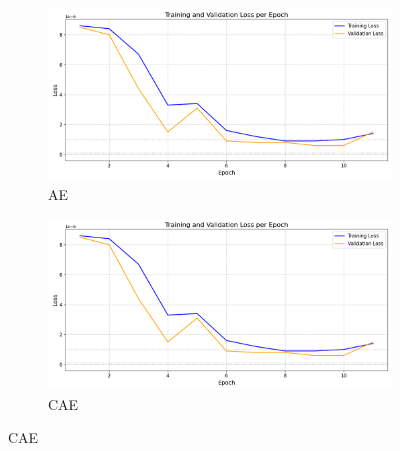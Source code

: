 \begin{figure}[!h]
  \centering
  \begin{subfigure}[t]{.6\textwidth}
    \centering
    \includegraphics[width=\linewidth]{figures/losses/ae.png}
    \caption{AE}
  \end{subfigure}
  \hfill
  \begin{subfigure}[t]{.6\textwidth}
    \centering
    \includegraphics[width=\linewidth]{figures/losses/ae.png}
    \caption{CAE}
  \end{subfigure}
  
  \vspace{1cm}
  

\end{figure}
